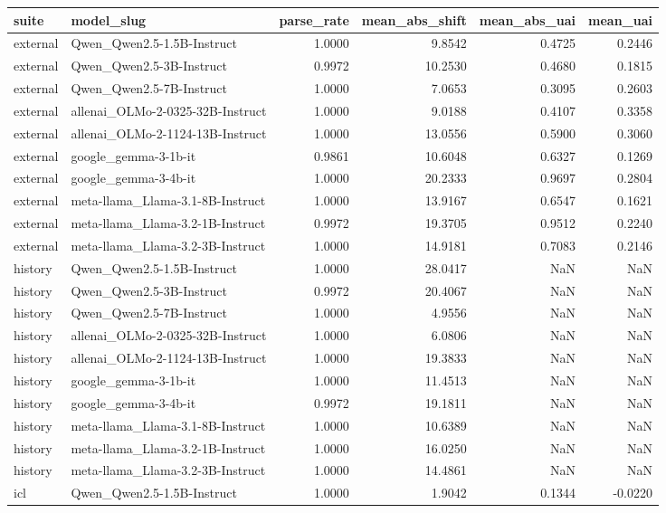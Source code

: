 \begin{tabular}{llrrrr}
\toprule
suite & model_slug & parse_rate & mean_abs_shift & mean_abs_uai & mean_uai \\
\midrule
external & Qwen_Qwen2.5-1.5B-Instruct & 1.0000 & 9.8542 & 0.4725 & 0.2446 \\
external & Qwen_Qwen2.5-3B-Instruct & 0.9972 & 10.2530 & 0.4680 & 0.1815 \\
external & Qwen_Qwen2.5-7B-Instruct & 1.0000 & 7.0653 & 0.3095 & 0.2603 \\
external & allenai_OLMo-2-0325-32B-Instruct & 1.0000 & 9.0188 & 0.4107 & 0.3358 \\
external & allenai_OLMo-2-1124-13B-Instruct & 1.0000 & 13.0556 & 0.5900 & 0.3060 \\
external & google_gemma-3-1b-it & 0.9861 & 10.6048 & 0.6327 & 0.1269 \\
external & google_gemma-3-4b-it & 1.0000 & 20.2333 & 0.9697 & 0.2804 \\
external & meta-llama_Llama-3.1-8B-Instruct & 1.0000 & 13.9167 & 0.6547 & 0.1621 \\
external & meta-llama_Llama-3.2-1B-Instruct & 0.9972 & 19.3705 & 0.9512 & 0.2240 \\
external & meta-llama_Llama-3.2-3B-Instruct & 1.0000 & 14.9181 & 0.7083 & 0.2146 \\
history & Qwen_Qwen2.5-1.5B-Instruct & 1.0000 & 28.0417 & NaN & NaN \\
history & Qwen_Qwen2.5-3B-Instruct & 0.9972 & 20.4067 & NaN & NaN \\
history & Qwen_Qwen2.5-7B-Instruct & 1.0000 & 4.9556 & NaN & NaN \\
history & allenai_OLMo-2-0325-32B-Instruct & 1.0000 & 6.0806 & NaN & NaN \\
history & allenai_OLMo-2-1124-13B-Instruct & 1.0000 & 19.3833 & NaN & NaN \\
history & google_gemma-3-1b-it & 1.0000 & 11.4513 & NaN & NaN \\
history & google_gemma-3-4b-it & 0.9972 & 19.1811 & NaN & NaN \\
history & meta-llama_Llama-3.1-8B-Instruct & 1.0000 & 10.6389 & NaN & NaN \\
history & meta-llama_Llama-3.2-1B-Instruct & 1.0000 & 16.0250 & NaN & NaN \\
history & meta-llama_Llama-3.2-3B-Instruct & 1.0000 & 14.4861 & NaN & NaN \\
icl & Qwen_Qwen2.5-1.5B-Instruct & 1.0000 & 1.9042 & 0.1344 & -0.0220 \\

\end{tabular}
